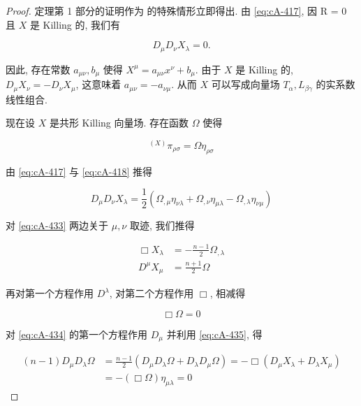\begin{proof}
定理第 1 部分的证明作为\hyperref[prop:cA-3.4]{} 的特殊情形立即得出. 由 \eqref{eq:cA-417}, 因 R = 0 且 $X$ 是 Killing 的, 我们有

\[
D_{\mu}D_{\nu}X_{\lambda} = 0.
\]

因此, 存在常数 $a_{\mu\nu}, b_{\mu}$ 使得 $X^{\mu} = a_{\mu\nu}x^{\nu} + b_{\mu}$. 由于 $X$ 是 Killing 的, $D_{\mu}X_{\nu} = -D_{\nu}X_{\mu}$, 这意味着 $a_{\mu\nu} = -a_{\nu\mu}$. 从而 $X$ 可以写成向量场 $T_{\alpha}, L_{\beta\gamma}$ 的实系数线性组合.

现在设 $X$ 是共形 Killing 向量场. 存在函数 $\Omega$ 使得

\begin{equation}
{}^{(X)}\pi_{\rho\sigma} = \Omega\eta_{\rho\sigma}\label{eq:cA-432}
\end{equation}

由 \eqref{eq:cA-417} 与 \eqref{eq:cA-418} 推得

\begin{equation}
D_{\mu}D_{\nu}X_{\lambda} = \frac{1}{2}\left(\Omega_{, \mu}\eta_{\nu\lambda} + \Omega_{, \nu}\eta_{\mu\lambda} - \Omega_{, \lambda}\eta_{\nu\mu}\right)\label{eq:cA-433}
\end{equation}

对 \eqref{eq:cA-433} 两边关于 $\mu, \nu$ 取迹, 我们推得

\begin{equation}
\begin{aligned}
\Box X_{\lambda} &= -\frac{n-1}{2}\Omega_{, \lambda} \\
D^{\mu}X_{\mu} &= \frac{n+1}{2}\Omega
\end{aligned}\label{eq:cA-434}
\end{equation}

再对第一个方程作用 $D^{\lambda}$, 对第二个方程作用 $\Box$, 相减得

\begin{equation}
\Box\Omega = 0\label{eq:cA-435}
\end{equation}

对 \eqref{eq:cA-434} 的第一个方程作用 $D_{\mu}$ 并利用 \eqref{eq:cA-435}, 得

\begin{equation}
\begin{aligned}
(n-1)D_{\mu}D_{\lambda}\Omega &= \frac{n-1}{2}(D_{\mu}D_{\lambda}\Omega + D_{\lambda}D_{\mu}\Omega) = -\Box(D_{\mu}X_{\lambda} + D_{\lambda}X_{\mu}) \\
&= -(\Box\Omega)\eta_{\mu\lambda} = 0
\end{aligned}\label{eq:cA-436}
\end{equation}


\end{proof}
